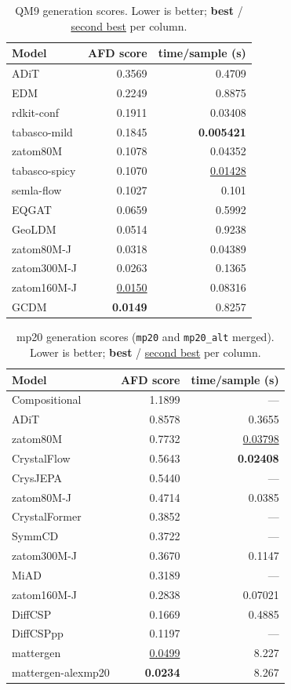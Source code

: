 \documentclass[11pt]{article}
\begin{document}
\begin{table}[H]
\centering
\small
\caption{QM9 generation scores. Lower is better; \textbf{best} / \underline{second best} per
column.}
\label{tab:eval_qm9}
\begin{tabular}{l r r}
\toprule
Model & AFD score & time/sample (s) \\
\midrule
ADiT          & 0.3569 & 0.4709 \\
EDM           & 0.2249 & 0.8875 \\
rdkit-conf    & 0.1911 & 0.03408 \\
tabasco-mild  & 0.1845 & \textbf{0.005421} \\
zatom80M      & 0.1078 & 0.04352 \\
tabasco-spicy & 0.1070 & \underline{0.01428} \\
semla-flow    & 0.1027 & 0.101 \\
EQGAT         & 0.0659 & 0.5992 \\
GeoLDM        & 0.0514 & 0.9238 \\
zatom80M-J    & 0.0318 & 0.04389 \\
zatom300M-J   & 0.0263 & 0.1365 \\
zatom160M-J   & \underline{0.0150} & 0.08316 \\
GCDM          & \textbf{0.0149} & 0.8257 \\
\bottomrule
\end{tabular}
\end{table}

\begin{table}[H]
\centering
\small
\caption{mp20 generation scores (\texttt{mp20} and \texttt{mp20\_alt} merged). Lower is
better; \textbf{best} / \underline{second best} per column.}
\label{tab:eval_mp20}
\begin{tabular}{l r r}
\toprule
Model & AFD score & time/sample (s) \\
\midrule
Compositional      & 1.1899 & --- \\
ADiT               & 0.8578 & 0.3655 \\
zatom80M           & 0.7732 & \underline{0.03798} \\
CrystalFlow        & 0.5643 & \textbf{0.02408} \\
CrysJEPA           & 0.5440 & --- \\
zatom80M-J         & 0.4714 & 0.0385 \\
CrystalFormer      & 0.3852 & --- \\
SymmCD             & 0.3722 & --- \\
zatom300M-J        & 0.3670 & 0.1147 \\
MiAD               & 0.3189 & --- \\
zatom160M-J        & 0.2838 & 0.07021 \\
DiffCSP            & 0.1669 & 0.4885 \\
DiffCSPpp          & 0.1197 & --- \\
mattergen          & \underline{0.0499} & 8.227 \\
mattergen-alexmp20 & \textbf{0.0234} & 8.267 \\
\bottomrule
\end{tabular}
\end{table}
\end{document}
